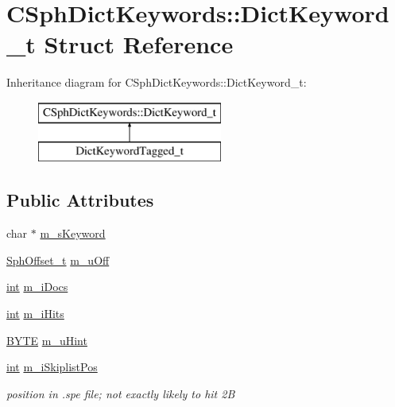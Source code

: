 \hypertarget{structCSphDictKeywords_1_1DictKeyword__t}{\section{C\-Sph\-Dict\-Keywords\-:\-:Dict\-Keyword\-\_\-t Struct Reference}
\label{structCSphDictKeywords_1_1DictKeyword__t}
}
Inheritance diagram for C\-Sph\-Dict\-Keywords\-:\-:Dict\-Keyword\-\_\-t\-:\begin{figure}[H]
\begin{center}
\leavevmode
\includegraphics[height=2.000000cm]{structCSphDictKeywords_1_1DictKeyword__t}
\end{center}
\end{figure}
\subsection*{Public Attributes}
\begin{DoxyCompactItemize}
\item 
char $\ast$ \hyperlink{structCSphDictKeywords_1_1DictKeyword__t_a802c205970ee420b229c189a6cc8ab4c}{m\-\_\-s\-Keyword}
\item 
\hyperlink{sphinx_8h_a0fb3b64afebef33c61367714754eaa90}{Sph\-Offset\-\_\-t} \hyperlink{structCSphDictKeywords_1_1DictKeyword__t_add9e740560bc723c87f469b2851d9d55}{m\-\_\-u\-Off}
\item 
\hyperlink{sphinxexpr_8cpp_a4a26e8f9cb8b736e0c4cbf4d16de985e}{int} \hyperlink{structCSphDictKeywords_1_1DictKeyword__t_a0982040d63d7a9db6da03b3385a33d68}{m\-\_\-i\-Docs}
\item 
\hyperlink{sphinxexpr_8cpp_a4a26e8f9cb8b736e0c4cbf4d16de985e}{int} \hyperlink{structCSphDictKeywords_1_1DictKeyword__t_a290245b2b674b75465e5b8c2456dba4a}{m\-\_\-i\-Hits}
\item 
\hyperlink{sphinxstd_8h_a4ae1dab0fb4b072a66584546209e7d58}{B\-Y\-T\-E} \hyperlink{structCSphDictKeywords_1_1DictKeyword__t_ad45c2b7d50354aca0e2e4c7e60d1acb8}{m\-\_\-u\-Hint}
\item 
\hyperlink{sphinxexpr_8cpp_a4a26e8f9cb8b736e0c4cbf4d16de985e}{int} \hyperlink{structCSphDictKeywords_1_1DictKeyword__t_aafcad88098bf96219344aa15fda6a521}{m\-\_\-i\-Skiplist\-Pos}
\begin{DoxyCompactList}\small\item\em position in .spe file; not exactly likely to hit 2\-B \end{DoxyCompactList}\end{DoxyCompactItemize}


